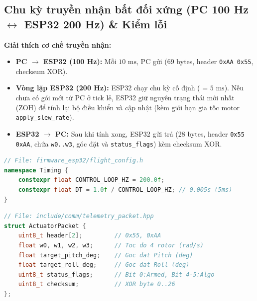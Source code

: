 \documentclass[11pt,a4paper]{article}
\begin{document}
\subsection{Chu kỳ truyền nhận bất đối xứng (PC 100 Hz $\leftrightarrow$ ESP32 200 Hz) \& Kiểm lỗi}
\noindent
\begin{minipage}[t]{0.45\textwidth}
\vspace{0pt}
\textbf{Giải thích cơ chế truyền nhận:}
\begin{itemize}
    \item \textbf{PC $\rightarrow$ ESP32 (100 Hz):} Mỗi $10\text{ ms}$, PC gửi  (69 bytes, header \texttt{0xAA 0x55}, checksum XOR).
    \item \textbf{Vòng lặp ESP32 (200 Hz):} ESP32 chạy chu kỳ cố định  ( = $5\text{ ms}$). Nếu chưa có gói mới từ PC ở tick lẻ, ESP32 giữ nguyên trạng thái mới nhất (ZOH) để tính lại bộ điều khiển và cập nhật  (kèm giới hạn gia tốc motor \texttt{apply\_slew\_rate}).
    \item \textbf{ESP32 $\rightarrow$ PC:} Sau khi tính xong, ESP32 gửi trả  (28 bytes, header \texttt{0x55 0xAA}, chứa \texttt{w0..w3}, góc đặt và \texttt{status\_flags}) kèm checksum XOR.
\end{itemize}
\end{minipage}
\hfill
\begin{minipage}[t]{0.52\textwidth}
\vspace{0pt}
\begin{lstlisting}[language=C++, firstnumber=42]
// File: firmware_esp32/flight_config.h
namespace Timing {
    constexpr float CONTROL_LOOP_HZ = 200.0f;
    constexpr float DT = 1.0f / CONTROL_LOOP_HZ; // 0.005s (5ms)
}
\end{lstlisting}
\vspace{0.4em}
\begin{lstlisting}[language=C++, firstnumber=65]
// File: include/comm/telemetry_packet.hpp
struct ActuatorPacket {
    uint8_t header[2];         // 0x55, 0xAA
    float w0, w1, w2, w3;      // Toc do 4 rotor (rad/s)
    float target_pitch_deg;    // Goc dat Pitch (deg)
    float target_roll_deg;     // Goc dat Roll (deg)
    uint8_t status_flags;      // Bit 0:Armed, Bit 4-5:Algo
    uint8_t checksum;          // XOR byte 0..26
};
\end{lstlisting}
\end{minipage}

\newpage
\end{document}
